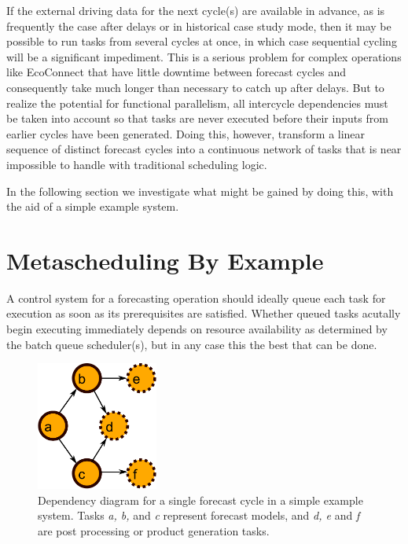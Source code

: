 \documentclass[11pt,a4paper]{article}
\begin{document}
If the external driving data for the next cycle(s) are available in
advance, as is frequently the case after delays or in historical case
study mode, then it may be possible to run tasks from several cycles at
once, in which case sequential cycling will be a significant impediment.
This is a serious problem for complex operations like EcoConnect that
have little downtime between forecast cycles and consequently take much
longer than necessary to catch up after delays.  But to realize the
potential for functional parallelism, all intercycle dependencies must
be taken into account so that tasks are never executed before their
inputs from earlier cycles have been generated. Doing this, however,
transform a linear sequence of distinct forecast cycles into a
continuous network of tasks that is near impossible to handle with
traditional scheduling logic.

In the following section we investigate what might be gained by doing
this, with the aid of a simple example system. 

\section{Metascheduling By Example}

A control system for a forecasting operation should ideally queue each
task for execution as soon as its prerequisites are satisfied. Whether
queued tasks acutally begin executing immediately depends on resource
availability as determined by the batch queue scheduler(s), but in any
case this the best that can be done. 

\begin{figure} 
    \begin{center}
    \includegraphics[width=4cm]{dependencies-one} 
    \end{center}
    \caption{\small Dependency diagram for a single forecast cycle in a
    simple example system. Tasks {\em a, b,} and {\em c} represent
    forecast models, and {\em d, e} and {\em f} are post processing or
    product generation tasks.} 
    \label{fig-dep-one} 
\end{figure} 
\end{document}
